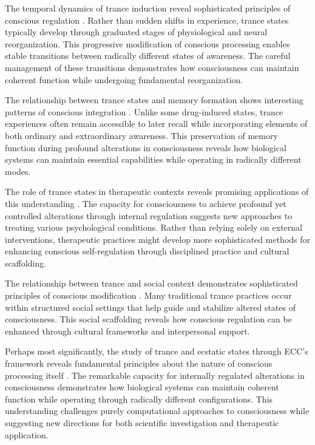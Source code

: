 The temporal dynamics of trance induction reveal sophisticated principles of conscious regulation \cite{Turner1992}. Rather than sudden shifts in experience, trance states typically develop through graduated stages of physiological and neural reorganization. This progressive modification of conscious processing enables stable transitions between radically different states of awareness. The careful management of these transitions demonstrates how consciousness can maintain coherent function while undergoing fundamental reorganization.

The relationship between trance states and memory formation shows interesting patterns of conscious integration \cite{Jilek1982}. Unlike some drug-induced states, trance experiences often remain accessible to later recall while incorporating elements of both ordinary and extraordinary awareness. This preservation of memory function during profound alterations in consciousness reveals how biological systems can maintain essential capabilities while operating in radically different modes.

The role of trance states in therapeutic contexts reveals promising applications of this understanding \cite{Crapanzano1973}. The capacity for consciousness to achieve profound yet controlled alterations through internal regulation suggests new approaches to treating various psychological conditions. Rather than relying solely on external interventions, therapeutic practices might develop more sophisticated methods for enhancing conscious self-regulation through disciplined practice and cultural scaffolding.

The relationship between trance and social context demonstrates sophisticated principles of conscious modification \cite{Houseman1998}. Many traditional trance practices occur within structured social settings that help guide and stabilize altered states of consciousness. This social scaffolding reveals how conscious regulation can be enhanced through cultural frameworks and interpersonal support.

Perhaps most significantly, the study of trance and ecstatic states through ECC's framework reveals fundamental principles about the nature of conscious processing itself \cite{Rouget1985}. The remarkable capacity for internally regulated alterations in consciousness demonstrates how biological systems can maintain coherent function while operating through radically different configurations. This understanding challenges purely computational approaches to consciousness while suggesting new directions for both scientific investigation and therapeutic application.

